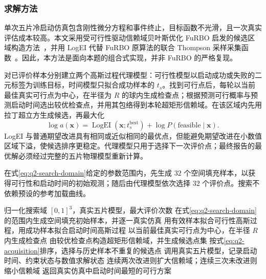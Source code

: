 \documentclass{gmcmthesis}
\begin{document}
\subsubsection{求解方法}
\label{subsec:q2-linear-method}

单次五片冷启动仿真包含刚性微分方程和事件终止，目标函数不光滑，且一次真实评估成本较高。本文采用受可行性驱动信赖域贝叶斯优化 FuRBO 启发的候选区域构造方法~\cite{ascia2025furbo}，并用 LogEI 代替 FuRBO 原算法的联合 Thompson 采样采集函数~\cite{ament2023logei}。因此，本方法是面向本题的组合式实现，并非 FuRBO 的严格复现。

对已评价样本分别建立两个高斯过程代理模型：可行性模型以启动成功或失败的二元标签为训练目标，时间模型只拟合成功样本的 $t_s$。找到可行点后，每轮以当前最佳真实可行点为中心，在半径为 $R$ 的球内生成检查点；根据预测可行概率与预测启动时间选出较优检查点，并用其包络得到本轮超矩形信赖域。在该区域内先用拉丁超立方生成候选，再最大化
\begin{equation}
  \log a(\bm{x})=
  \operatorname{LogEI}\!\left(\bm{x};t_s^{\mathrm{best}}\right)
  +\log P\!\left(\mathrm{feasible}\mid\bm{x}\right).
  \label{eq:q2-acquisition}
\end{equation}
LogEI 与普通期望改进具有相同或近似相同的最优点，但能避免期望改进在小数值区域下溢，使候选排序更稳定。代理模型只用于选择下一次评价点；最终报告的最优解必须经过完整的五片物理模型重新计算。

在式\eqref{eq:q2-search-domain}给定的参数范围内，先生成 $32$ 个空间填充样本，以获得可行性和启动时间的初始观测；随后由代理模型依次选择 $32$ 个评价点。搜索不依赖预设的参考加载曲线。

\begin{algorithm}[H]
  \caption{可行性驱动信赖域贝叶斯搜索（以线性加载参数为例）}
  \label{alg:q2-search}
  \begin{algorithmic}[1]
    \REQUIRE 归一化搜索域 $[0,1]^3$，真实五片模型，最大评价次数
    \STATE 在式\eqref{eq:q2-search-domain}的范围内生成空间填充初始样本，并逐一真实仿真
      \STATE 用有效样本拟合可行性高斯过程，用成功样本拟合启动时间高斯过程
      \STATE 以当前最佳真实可行点为中心，在半径 $R$ 内生成检查点
      \STATE 由较优检查点构造超矩形信赖域，并生成候选点集
      \STATE 按式\eqref{eq:q2-acquisition}排序，选择与历史样本不重复的候选点
      \STATE 调用真实五片模型，记录启动时间、约束状态与数值求解状态
      \STATE 连续两次改进则扩大信赖域；连续三次未改进则缩小信赖域
    \ENDWHILE
    \ENSURE 返回真实仿真中启动时间最短的可行方案
  \end{algorithmic}
\end{algorithm}
\end{document}
